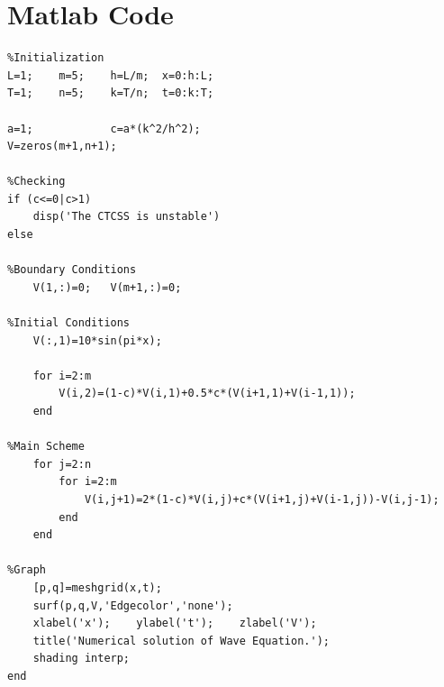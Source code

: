 \documentclass[a4paper,14pt,twoside,onecolumn,openany,final]{memoir}
\begin{document}
\clearpage
\section{Matlab Code}
\begin{verbatim}
%Initialization
L=1;	m=5;	h=L/m;	x=0:h:L;
T=1;	n=5;	k=T/n;	t=0:k:T;

a=1;			c=a*(k^2/h^2);
V=zeros(m+1,n+1);

%Checking
if (c<=0|c>1)
    disp('The CTCSS is unstable')
else

%Boundary Conditions
    V(1,:)=0;	V(m+1,:)=0;

%Initial Conditions
    V(:,1)=10*sin(pi*x);

    for i=2:m
        V(i,2)=(1-c)*V(i,1)+0.5*c*(V(i+1,1)+V(i-1,1));
    end

%Main Scheme
    for j=2:n
        for i=2:m
            V(i,j+1)=2*(1-c)*V(i,j)+c*(V(i+1,j)+V(i-1,j))-V(i,j-1);
        end
    end

%Graph
    [p,q]=meshgrid(x,t);
    surf(p,q,V,'Edgecolor','none');
    xlabel('x');	ylabel('t');	zlabel('V');
    title('Numerical solution of Wave Equation.');
    shading interp;
end
\end{verbatim}
\end{document}
